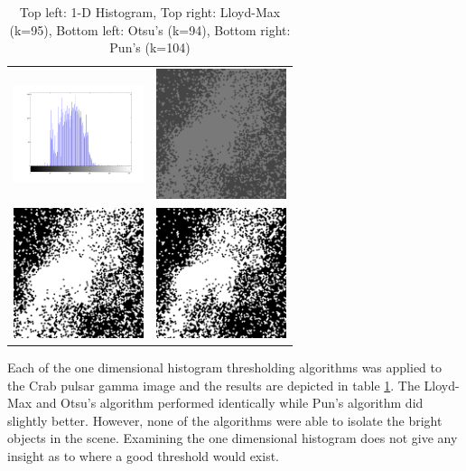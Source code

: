 \documentclass[journal]{IEEEtran}
\begin{document}
\begin{table}[!h]
\centering
\begin{tabular}{cc}
\includegraphics[width=1.5in]{../results/crabpulsar-gamma_hist.png} &
\includegraphics[width=1.5in]{../results/crabpulsar-gamma_lloydmax.png} \\
\newline
\includegraphics[width=1.5in]{../results/crabpulsar-gamma_otsu.png} &
\includegraphics[width=1.5in]{../results/crabpulsar-gamma_pun.png} \\
\end{tabular}
\caption{Top left: 1-D Histogram, Top right: Lloyd-Max (k=95), Bottom left: Otsu's (k=94), Bottom right: Pun's (k=104)}
\label{tab:gammaTable1}
\end{table}

\par Each of the one dimensional histogram thresholding algorithms was applied to the Crab pulsar gamma image and the results are depicted in table \ref{tab:gammaTable1}. The Lloyd-Max and Otsu's algorithm performed identically while Pun's algorithm did slightly better. However, none of the algorithms were able to isolate the bright objects in the scene. Examining the one dimensional histogram does not give any insight as to where a good threshold would exist.
\end{document}
